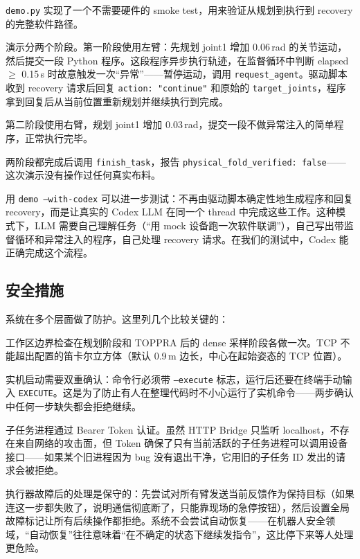 \texttt{demo.py} 实现了一个不需要硬件的 smoke test，用来验证从规划到执行到 recovery 的完整软件路径。

演示分两个阶段。第一阶段使用左臂：先规划 joint1 增加 0.06\,rad 的关节运动，然后提交一段 Python 程序。这段程序异步执行轨迹，在监督循环中判断 elapsed $\geq$ 0.15\,s 时故意触发一次``异常''——暂停运动，调用 \texttt{request\_agent}。驱动脚本收到 recovery 请求后回复 \texttt{action: "continue"} 和原始的 \texttt{target\_joints}，程序拿到回复后从当前位置重新规划并继续执行到完成。

第二阶段使用右臂，规划 joint1 增加 0.03\,rad，提交一段不做异常注入的简单程序，正常执行完毕。

两阶段都完成后调用 \texttt{finish\_task}，报告 \texttt{physical\_fold\_verified: false}——这次演示没有操作过任何真实布料。

用 \texttt{demo --with-codex} 可以进一步测试：不再由驱动脚本确定性地生成程序和回复 recovery，而是让真实的 Codex LLM 在同一个 thread 中完成这些工作。这种模式下，LLM 需要自己理解任务（``用 mock 设备跑一次软件联调''），自己写出带监督循环和异常注入的程序，自己处理 recovery 请求。在我们的测试中，Codex 能正确完成这个流程。


\subsection{安全措施}
\label{subsec:agent-safety}

系统在多个层面做了防护。这里列几个比较关键的：

工作区边界检查在规划阶段和 TOPPRA 后的 dense 采样阶段各做一次。TCP 不能超出配置的笛卡尔立方体（默认 0.9\,m 边长，中心在起始姿态的 TCP 位置）。

实机启动需要双重确认：命令行必须带 \texttt{--execute} 标志，运行后还要在终端手动输入 \texttt{EXECUTE}。这是为了防止有人在整理代码时不小心运行了实机命令——两步确认中任何一步缺失都会拒绝继续。

子任务进程通过 Bearer Token 认证。虽然 HTTP Bridge 只监听 localhost，不存在来自网络的攻击面，但 Token 确保了只有当前活跃的子任务进程可以调用设备接口——如果某个旧进程因为 bug 没有退出干净，它用旧的子任务 ID 发出的请求会被拒绝。

执行器故障后的处理是保守的：先尝试对所有臂发送当前反馈作为保持目标（如果连这一步都失败了，说明通信彻底断了，只能靠现场的急停按钮），然后设置全局故障标记让所有后续操作都拒绝。系统不会尝试自动恢复——在机器人安全领域，``自动恢复''往往意味着``在不确定的状态下继续发指令''，这比停下来等人处理更危险。


